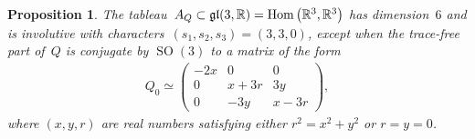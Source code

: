 \documentclass[pdftex]{sigma}
\numberwithin{equation}{section}
\newtheorem{Proposition}[Theorem]{Proposition}
 { \theoremstyle{definition}
\newtheorem{Example}[Theorem]{Example}
\newtheorem{Remark}[Theorem]{Remark} }
\newcommand{\bbR}{{\mathbb R}}
\newcommand{\SO}{\operatorname{SO}}
\newcommand{\eugl}{\operatorname{\frak{gl}}}
\DeclareMathOperator{\Hom}{Hom}
\begin{document}
\begin{Proposition}\label{prop: nondegenerateA_Q}
The tableau~$A_Q\subset \eugl(3,\bbR) = \Hom \big(\bbR^3,\bbR^3\big)$
has dimension~$6$ and is involutive
with characters~$(s_1,s_2,s_3) = (3,3,0)$,
except when the trace-free part of~$Q$ is conjugate by $\SO(3)$
to a matrix of the form
\begin{gather}\label{eq: Q0normalizeddegenerate}
Q_0 \simeq \begin{pmatrix}-2x&0&0\\0&x+3r&3y\\0&-3y&x-3r\end{pmatrix},
\end{gather}
where $(x,y,r)$ are real numbers satisfying either $r^2 = x^2 + y^2$
or $r = y = 0$.
\end{Proposition}
\end{document}

